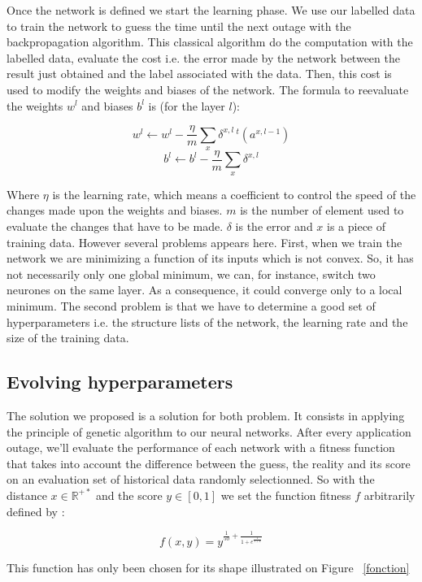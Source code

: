 \documentclass[10pt,a4paper,oneside]{article}
\begin{document}
\begin{multicols}{2}
Once the network is defined we start the learning phase. We use our labelled data to train the network to guess the time until the next outage with the backpropagation algorithm. This classical algorithm do the computation with the labelled data, evaluate the cost i.e. the error made by the network between the result just obtained and the label associated with the data. Then, this cost is used to modify the weights and biases of the network.
The formula to reevaluate the weights $w^l$ and biases $b^l$ is (for the layer $l$):

\vspace{0.8cm}

\begin{Large}
\[ w^l \leftarrow  w^l-\frac{\eta}{m} \sum_x \delta^{x,l} \,{}^t(a^{x,l-1}) \]
\[ b^l \leftarrow b^l-\frac{\eta}{m} \sum_x \delta^{x,l} \]
\end{Large}

\vspace{0.8cm}


Where $\eta$ is the learning rate, which means a coefficient to control the speed of the changes made upon the weights and biases. $m$ is the number of element used to evaluate the changes that have to be made. $\delta$ is the error and $x$ is a piece of training data.
However several problems appears here. First, when we train the network we are minimizing a function of its inputs which is not convex. So, it has not necessarily only one global minimum, we can, for instance, switch two neurones on the same layer. As a consequence, it could converge only to a local minimum.
The second problem is that we have to determine a good set of hyperparameters i.e. the structure lists of the network, the learning rate and the size of the training data.

\subsection{Evolving hyperparameters}
The solution we proposed is a solution for both problem. It consists in applying the principle of genetic algorithm to our neural networks. After every application outage, we'll evaluate the performance of each network with a fitness function that takes into account the difference between the guess, the reality and its score on an evaluation set of historical data randomly selectionned. So with the distance $x\in\mathbb{R}^{+*}$ and the score $y\in[0, 1]$ we set the function fitness $f$ arbitrarily defined by :

\vspace{0.8cm}

\begin{Large}
\[ f(x, y) = y^{\frac{1}{50}+\frac{1}{1+e^{\frac{1}{1+x}}}} \]
\end{Large}

\vspace{0.8cm}

This function has only been chosen for its shape illustrated on Figure ~\ref{fonction}

\end{multicols}
\end{document}
